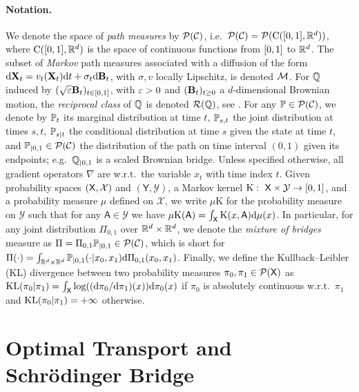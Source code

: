 \documentclass{article}
\begin{document}
\paragraph{Notation.} We denote the space of \emph{path
measures} by $\mathcal{P}(\mathcal{C})$, i.e.~$\mathcal{P}(\mathcal{C})=\mathcal{P}(\mathrm{C}([0,1], \mathbb{R}^d))$, where $\mathrm{C}([0,1], \mathbb{R}^d)$ is the space of continuous functions from $[0,1]$ to $\mathbb{R}^d$.
The subset of \emph{Markov} path measures associated
with a diffusion of the form
$\mathrm{d} \mathbf{X}_t = v_t(\mathbf{X}_t) \mathrm{d} t + \sigma_t \mathrm{d} \mathbf{B}_t$, with $\sigma,v$
locally Lipschitz, is denoted $\mathcal{M}$.  For $\mathbb{Q}$ induced by $(\sqrt{\varepsilon} \mathbf{B}_t)_{t \in [0,1]}$, with $\varepsilon >0$ and $(\mathbf{B}_t)_{t \geq 0}$ a $d$-dimensional Brownian motion, the \emph{reciprocal class}  of $\mathbb{Q}$
is denoted $\mathcal{R}(\mathbb{Q})$, see
. For any $\mathbb{P} \in \mathcal{P}(\mathcal{C})$, we denote by $\mathbb{P}_t$ its marginal
distribution at time $t$, $\mathbb{P}_{s,t}$ the joint distribution at times $s,t$, $\mathbb{P}_{s|t}$ the conditional distribution at time $s$ given the state at
time $t$, and $\mathbb{P}_{|0,1} \in \mathcal{P}(\mathcal{C})$ the distribution of the path on time interval $(0,1)$ given its endpoints; e.g.~$\mathbb{Q}_{|0,1}$ is a scaled Brownian bridge. Unless specified otherwise, all gradient operators $\nabla$ are
w.r.t.~the variable $x_t$ with time index $t$. Given probability spaces $(\mathsf{X}, \mathcal{X})$ and $(\mathsf{Y}, \mathcal{Y})$, a Markov kernel $\mathrm{K}: \ \mathsf{X} \times \mathcal{Y} \to [0,1]$, and a probability measure $\mu$ defined on $\mathcal{X}$, we write $\mu \mathrm{K}$ for the probability measure on $\mathcal{Y}$ such that for any $\mathsf{A} \in \mathcal{Y}$ we have $\mu \mathrm{K}(\mathsf{A}) = \int_{\mathsf{X}} \mathrm{K}(x, \mathsf{A}) \mathrm{d} \mu(x)$. 
In particular, for any joint distribution $\Pi_{0,1}$ over $\mathbb{R}^d \times \mathbb{R}^d$, we denote the \emph{mixture of bridges} measure as $\Pi = \Pi_{0,1} \mathbb{P}_{|0,1} \in \mathcal{P}(\mathcal{C})$, which is short for $\Pi(\cdot) = \int_{\mathbb{R}^d \times \mathbb{R}^d} \mathbb{P}_{|0,1}(\cdot|x_0, x_1) \mathrm{d} \Pi_{0,1}(x_0, x_1)$. Finally, we define the Kullback--Leibler (KL) divergence between two probability measures $\pi_0, \pi_1 \in \mathcal{P}(\mathsf{X})$ as $\mathrm{KL}(\pi_0 | \pi_1) = \int_{\mathsf{X}} \log ((\mathrm{d} \pi_0 / \mathrm{d} \pi_1)(x)) \mathrm{d} \pi_0(x)$ if $\pi_0$ is absolutely continuous w.r.t.~$\pi_1$ and $\mathrm{KL}(\pi_0 | \pi_1) = +\infty$ otherwise. 

\section{Optimal Transport and Schr\"odinger Bridge}
\label{sec:background}
\end{document}
